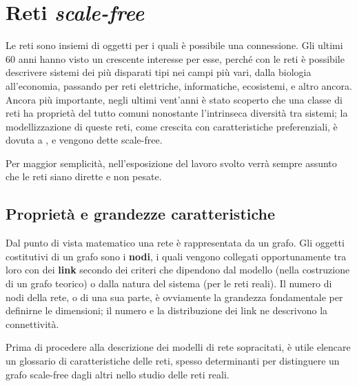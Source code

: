 
\section{Reti \emph{scale-free}}
\label{sec:teoria}
Le reti sono insiemi di oggetti per i quali è possibile una connessione. Gli ultimi 60 anni hanno visto un crescente interesse per esse, perché con le reti è possibile descrivere sistemi dei più disparati tipi nei campi più vari, dalla biologia all'economia, passando per reti elettriche, informatiche, ecosistemi,  e altro ancora. Ancora più importante, negli ultimi vent'anni è stato scoperto che una classe di reti ha proprietà del tutto comuni nonostante l'intrinseca diversità tra sistemi; la modellizzazione di queste reti, come crescita con caratteristiche preferenziali, è dovuta a \textcite{Barbalbert1999}, e vengono dette scale-free.

Per maggior semplicità, nell'esposizione del lavoro svolto verrà sempre assunto che le reti siano dirette e non pesate.

\subsection{Proprietà e grandezze caratteristiche}
Dal punto di vista matematico una rete è rappresentata da un grafo. Gli oggetti costitutivi di un grafo sono i \textbf{nodi}, i quali vengono collegati opportunamente tra loro con dei \textbf{link} secondo dei criteri che dipendono dal modello (nella costruzione di un grafo teorico) o dalla natura del sistema (per le reti reali). Il numero di nodi della rete, o di una sua parte, è ovviamente la grandezza fondamentale per definirne le dimensioni; il numero e la distribuzione dei link ne descrivono la connettività.

Prima di procedere alla descrizione dei modelli di rete sopracitati, è utile elencare un glossario di caratteristiche delle reti, spesso determinanti per distinguere un grafo scale-free dagli altri nello studio delle reti reali.


